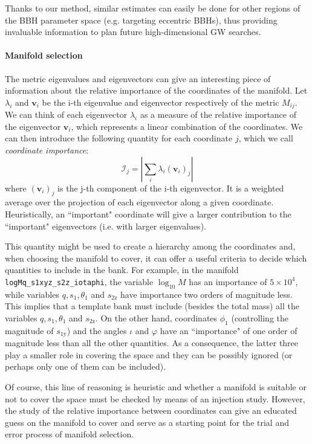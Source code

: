 \documentclass[twocolumn,showpacs,preprintnumbers,nofootinbib,prd,
superscriptaddress,10pt]{revtex4-2}
\begin{document}
Thanks to our method, similar estimates can easily be done for other regions of the BBH parameter space (e.g. targeting eccentric BBHs), thus providing invaluable information to plan future high-dimensional GW searches.

\paragraph{Manifold selection}\label{par:manifold_selection}

The metric eigenvalues and eigenvectors can give an interesting piece of information about the relative importance of the coordinates of the manifold.
Let $\lambda_i$ and $\mathbf{v}_i$ be the i-th eigenvalue and eigenvector respectively of the metric $M_{ij}$.
We can think of each eigenvector $\lambda_i$ as a measure of the relative importance of the eigenvector $\mathbf{v}_i$, which represents a linear combination of the coordinates.
We can then introduce the following quantity for each coordinate $j$, which we call {\it coordinate importance}:
\begin{equation}
\mathcal{I}_j = \left| \sum_i \lambda_i (\mathbf{v}_i)_j \right|
\end{equation}
where $(\mathbf{v}_i)_j$ is the j-th component of the i-th eigenvector.
It is a weighted average over the projection of each eigenvector along a given coordinate. Heuristically, an ``important" coordinate will give a larger contribution to the ``important" eigenvectors (i.e. with larger eigenvalues).

This quantity might be used to create a hierarchy among the coordinates and, when choosing the manifold to cover, it can offer a useful criteria to decide which quantities to include in the bank.
For example, in the manifold \texttt{logMq\_s1xyz\_s2z\_iotaphi}, the variable $\log_{10}M$ has an importance of $5\times 10^4$, while variables $q, s_1, \theta_1$ and $s_\text{2z}$ have importance two orders of magnitude less. This implies that a template bank must include (besides the total mass) all the variables $q, s_1, \theta_1$ and $s_\text{2z}$.
On the other hand, coordinates $\phi_1$ (controlling the magnitude of $s_\text{1y}$) and the angles $\iota$ and $\varphi$ have an ``importance" of one order of magnitude less than all the other quantities. As a consequence, the latter three play a smaller role in covering the space and they can be possibly ignored (or perhaps only one of them can be included).

Of course, this line of reasoning is heuristic and whether a manifold is suitable or not to cover the space must be checked by means of an injection study. However, the study of the relative importance between coordinates can give an educated guess on the manifold to cover and serve as a starting point for the trial and error process of manifold selection.
\end{document}
